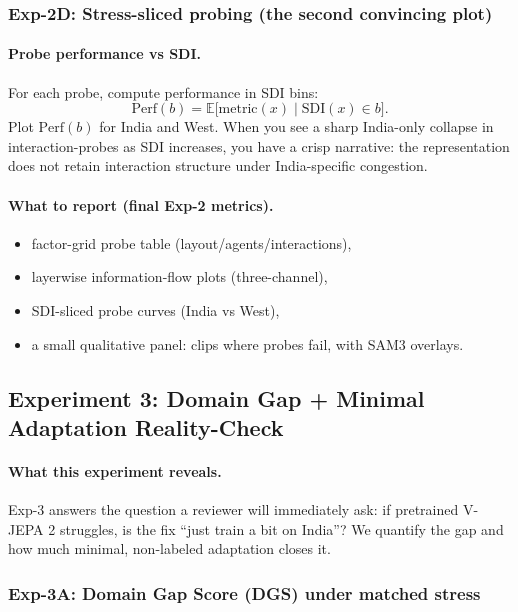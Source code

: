 \subsubsection{Exp-2D: Stress-sliced probing (the second convincing plot)}

\paragraph{Probe performance vs SDI.}
For each probe, compute performance in SDI bins:
\[
\mathrm{Perf}(b) = \mathbb{E}\big[\mathrm{metric}(x)\mid \mathrm{SDI}(x)\in b\big].
\]
Plot $\mathrm{Perf}(b)$ for India and West. When you see a sharp India-only collapse in interaction-probes as SDI increases, you have a crisp narrative: the representation does not retain interaction structure under India-specific congestion.

\paragraph{What to report (final Exp-2 metrics).}
\begin{itemize}[leftmargin=*,itemsep=2pt]
  \item factor-grid probe table (layout/agents/interactions),
  \item layerwise information-flow plots (three-channel),
  \item SDI-sliced probe curves (India vs West),
  \item a small qualitative panel: clips where probes fail, with SAM3 overlays.
\end{itemize}

\subsection{Experiment 3: Domain Gap + Minimal Adaptation Reality-Check}
\label{sec:exp3}

\paragraph{What this experiment reveals.}
Exp-3 answers the question a reviewer will immediately ask: if pretrained V-JEPA 2 struggles, is the fix “just train a bit on India”? We quantify the gap and how much minimal, non-labeled adaptation closes it.

\subsubsection{Exp-3A: Domain Gap Score (DGS) under matched stress}

